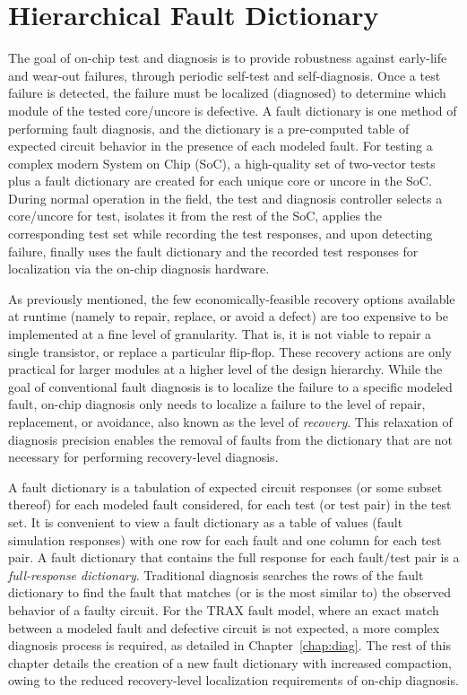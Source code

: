 \chapter{Hierarchical Fault Dictionary}
\label{chap:dict}

The goal of on-chip test and diagnosis is to provide robustness against early-life and wear-out failures, through periodic self-test and self-diagnosis.
%
Once a test failure is detected, the failure must be localized (diagnosed) to determine which module of the tested core/uncore is defective.
%
A fault dictionary is one method of performing fault diagnosis, and the dictionary is a pre-computed table of expected circuit behavior in the presence of each modeled fault.
%
For testing a complex modern System on Chip (SoC), a high-quality set of two-vector tests plus a fault dictionary are created for each unique core or uncore in the SoC.
%
During normal operation in the field, the test and diagnosis controller selects a core/uncore for test, isolates it from the rest of the SoC, applies the corresponding test set while recording the test responses, and upon detecting failure, finally uses the fault dictionary and the recorded test responses for localization via the on-chip diagnosis hardware.

As previously mentioned, the few economically-feasible recovery options available at runtime (namely to repair, replace, or avoid a defect) are too expensive to be implemented at a fine level of granularity.
%
That is, it is not viable to repair a single transistor, or replace a particular flip-flop.
%
These recovery actions are only practical for larger modules at a higher level of the design hierarchy.
%
While the goal of conventional fault diagnosis is to localize the failure to a specific modeled fault, on-chip diagnosis only needs to localize a failure to the level of repair, replacement, or avoidance, also known as the level of \textit{recovery}.
%
This relaxation of diagnosis precision enables the removal of faults from the dictionary that are not necessary for performing recovery-level diagnosis.

A fault dictionary is a tabulation of expected circuit responses (or some subset thereof) for each modeled fault considered, for each test (or test pair) in the test set.
%
It is convenient to view a fault dictionary as a table of values (fault simulation responses) with one row for each fault and one column for each test pair.
%
A fault dictionary that contains the full response for each fault/test pair is a \textit{full-response dictionary}.
%
Traditional diagnosis searches the rows of the fault dictionary to find the fault that matches (or is the most similar to) the observed behavior of a faulty circuit.
%
For the TRAX fault model, where an exact match between a modeled fault and defective circuit is not expected, a more complex diagnosis process is required, as detailed in Chapter~\ref{chap:diag}.
%
The rest of this chapter details the creation of a new fault dictionary with increased compaction, owing to the reduced recovery-level localization requirements of on-chip diagnosis.


